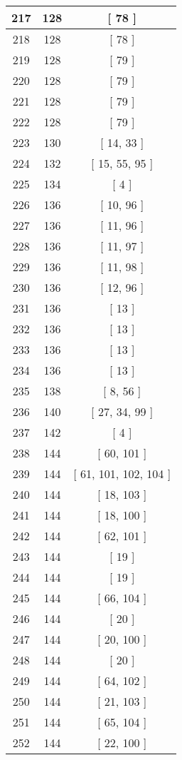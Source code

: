\begin{center}
\begin{longtable}[H]{|| c c c ||}
\hline
217 & 128 & [ 78 ] \\ 
\hline
218 & 128 & [ 78 ] \\ 
\hline
219 & 128 & [ 79 ] \\ 
\hline
220 & 128 & [ 79 ] \\ 
\hline
221 & 128 & [ 79 ] \\ 
\hline
222 & 128 & [ 79 ] \\ 
\hline
223 & 130 & [ 14, 33 ] \\ 
\hline
224 & 132 & [ 15, 55, 95 ] \\ 
\hline
225 & 134 & [ 4 ] \\ 
\hline
226 & 136 & [ 10, 96 ] \\ 
\hline
227 & 136 & [ 11, 96 ] \\ 
\hline
228 & 136 & [ 11, 97 ] \\ 
\hline
229 & 136 & [ 11, 98 ] \\ 
\hline
230 & 136 & [ 12, 96 ] \\ 
\hline
231 & 136 & [ 13 ] \\ 
\hline
232 & 136 & [ 13 ] \\ 
\hline
233 & 136 & [ 13 ] \\ 
\hline
234 & 136 & [ 13 ] \\ 
\hline
235 & 138 & [ 8, 56 ] \\ 
\hline
236 & 140 & [ 27, 34, 99 ] \\ 
\hline
237 & 142 & [ 4 ] \\ 
\hline
238 & 144 & [ 60, 101 ] \\ 
\hline
239 & 144 & [ 61, 101, 102, 104 ] \\ 
\hline
240 & 144 & [ 18, 103 ] \\ 
\hline
241 & 144 & [ 18, 100 ] \\ 
\hline
242 & 144 & [ 62, 101 ] \\ 
\hline
243 & 144 & [ 19 ] \\ 
\hline
244 & 144 & [ 19 ] \\ 
\hline
245 & 144 & [ 66, 104 ] \\ 
\hline
246 & 144 & [ 20 ] \\ 
\hline
247 & 144 & [ 20, 100 ] \\ 
\hline
248 & 144 & [ 20 ] \\ 
\hline
249 & 144 & [ 64, 102 ] \\ 
\hline
250 & 144 & [ 21, 103 ] \\ 
\hline
251 & 144 & [ 65, 104 ] \\ 
\hline
252 & 144 & [ 22, 100 ] \\ 

\end{longtable}
\end{center}
